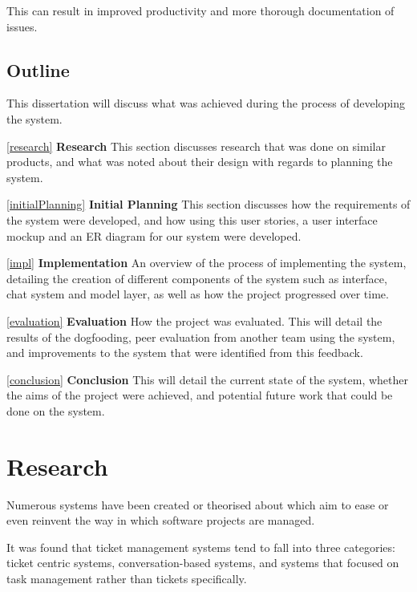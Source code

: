 \documentclass[a4paper]{l3proj}
\begin{document}
This can result in improved productivity and more thorough documentation of issues.

\section{Outline}
\label{outline}

This dissertation will discuss what was achieved during the process of developing the system.

\autoref{research} \textbf{Research} 
This section discusses research that was done on similar products, and what was noted about their design with regards to planning the system.

\autoref{initialPlanning} \textbf{Initial Planning} 
This section discusses how the requirements of the system were developed, and how using this user stories, a user interface mockup and an ER diagram for our system were developed.

\autoref{impl} \textbf{Implementation} 
An overview of the process of implementing the system, detailing the creation of different components of the system such as interface, chat system and model layer, as well as how the project progressed over time.

\autoref{evaluation} \textbf{Evaluation} 
How the project was evaluated.  This will detail the results of the dogfooding, peer evaluation from another team using the system, and improvements to the system that were identified from this feedback.

\autoref{conclusion} \textbf{Conclusion} 
This will detail the current state of the system, whether the aims of the project were achieved, and potential future work that could be done on the system.


\chapter{Research}
\label{research}

Numerous systems have been created or theorised about which aim to ease or even reinvent the way in which software projects are managed.

It was found that ticket management systems tend to fall into three categories: ticket centric systems, conversation-based systems, and systems that focused on task management rather than tickets specifically. 
\end{document}
